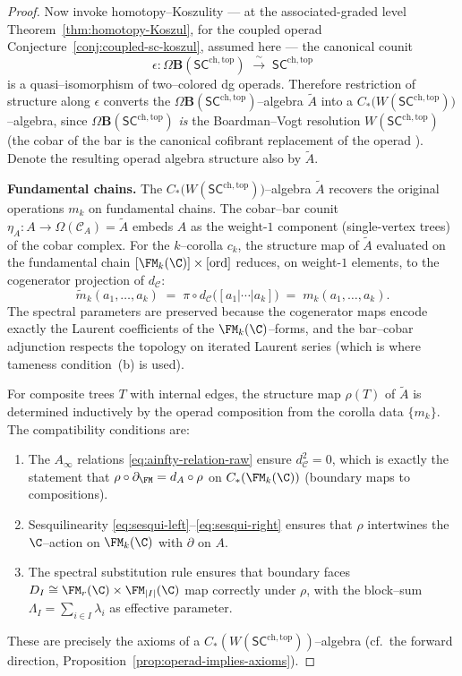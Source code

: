 \begin{proof}
Now invoke homotopy--Koszulity --- at the associated-graded
level Theorem~\ref{thm:homotopy-Koszul}, for the coupled operad
Conjecture~\ref{conj:coupled-sc-koszul}, assumed here --- the
canonical counit
\[
 \epsilon \colon
 \Omega\mathbf{B}(\mathsf{SC}^{\mathrm{ch,top}})
 \;\xrightarrow{\;\sim\;}\;
 \mathsf{SC}^{\mathrm{ch,top}}
\]
is a quasi--isomorphism of two--colored dg operads. Therefore
restriction of structure along $\epsilon$ converts the
$\Omega\mathbf{B}(\mathsf{SC}^{\mathrm{ch,top}})$--algebra
$\widetilde{A}$ into a
$C_\ast\!\bigl(W(\mathsf{SC}^{\mathrm{ch,top}})\bigr)$--algebra,
since $\Omega\mathbf{B}(\mathsf{SC}^{\mathrm{ch,top}})$
\emph{is} the Boardman--Vogt resolution
$W(\mathsf{SC}^{\mathrm{ch,top}})$ (the cobar of the bar is
the canonical cofibrant replacement of the operad \cite{BM03}).
Denote the resulting operad algebra structure also by
$\widetilde{A}$.

\medskip
\textbf{Fundamental chains.}
The $C_\ast\!\bigl(W(\mathsf{SC}^{\mathrm{ch,top}})\bigr)$--algebra
$\widetilde{A}$ recovers the original operations $m_k$ on
fundamental chains. The cobar--bar counit
$\eta_A \colon A \to \Omega(\mathcal{C}_A) = \widetilde{A}$
embeds $A$ as the weight-$1$ component (single-vertex trees)
of the cobar complex. For the $k$--corolla $c_k$, the
structure map of $\widetilde{A}$ evaluated on the fundamental
chain $[\FM_k(\C)] \times [\mathrm{ord}]$ reduces, on
weight-$1$ elements, to the cogenerator projection of
$d_{\mathcal{C}}$:
\[
 \widetilde{m}_k(a_1, \ldots, a_k)
 \;=\; \pi \circ d_{\mathcal{C}}
 \bigl([a_1 | \cdots | a_k]\bigr)
 \;=\; m_k(a_1, \ldots, a_k).
\]
The spectral parameters are preserved because the
cogenerator maps encode exactly the Laurent coefficients of
the $\FM_k(\C)$--forms, and the bar--cobar adjunction respects
the topology on iterated Laurent series (which is where
tameness condition~(b) is used).

For composite trees $T$ with internal edges, the structure map
$\rho(T)$ of $\widetilde{A}$ is determined inductively by the
operad composition from the corolla data $\{m_k\}$. The
compatibility conditions are:
\begin{enumerate}[label=(\roman*)]
 \item The $A_\infty$ relations \eqref{eq:ainfty-relation-raw}
 ensure $d_{\mathcal{C}}^2 = 0$, which is exactly the
 statement that $\rho \circ \partial_{\FM} = d_A \circ \rho$
 on $C_\ast(\FM_k(\C))$ (boundary maps to compositions).
 \item Sesquilinearity \eqref{eq:sesqui-left}--\eqref{eq:sesqui-right}
 ensures that $\rho$ intertwines the $\C$--action on $\FM_k(\C)$
 with $\partial$ on $A$.
 \item The spectral substitution rule ensures that boundary
 faces $D_I \cong \FM_r(\C) \times \FM_{|I|}(\C)$ map
 correctly under $\rho$, with the block--sum
 $\Lambda_I = \sum_{i \in I} \lambda_i$ as effective parameter.
\end{enumerate}
These are precisely the axioms of a
$C_\ast(W(\mathsf{SC}^{\mathrm{ch,top}}))$--algebra
(cf.\ the forward direction, Proposition~\ref{prop:operad-implies-axioms}).


\end{proof}
